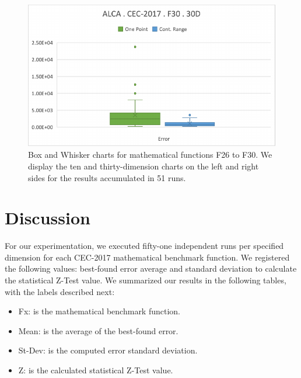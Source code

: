 \documentclass[graybox]{svmult}
\begin{document}
\begin{figure}[!ht]
\begin{minipage}[h]{0.49\linewidth}
        \end{minipage}
        \hfill
        \begin{minipage}[h]{0.49\linewidth}
            \includegraphics[width=1\linewidth]{img/fig_experiment_F30x30D.pdf} 
        \end{minipage}        

        \caption{Box and Whisker charts for mathematical functions F26 to F30. We display the ten and thirty-dimension charts on the left and right sides for the results accumulated in 51 runs.} \label{fig.experiment_F26-F30}
    \end{figure}

    \FloatBarrier


\section{Discussion}
    \label{section.discussion}

    For our experimentation, we executed fifty-one independent runs per specified dimension for each CEC-2017 mathematical benchmark function. We registered the following values: best-found error average and standard deviation to calculate the statistical Z-Test value. We summarized our results in the following tables, with the labels described next:

    \begin{itemize}
        \item   Fx:          is the mathematical benchmark function.
        \item   Mean:        is the average of the best-found error.
        \item   St-Dev:      is the computed error standard deviation. 
        \item   Z:           is the calculated statistical Z-Test value.
    \end{itemize}
\end{document}
